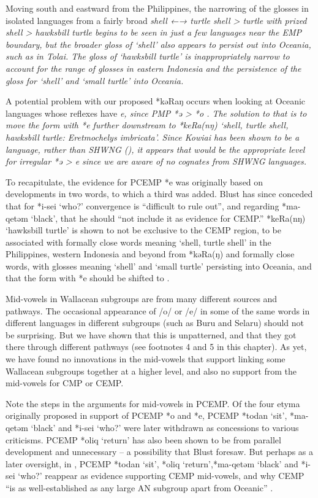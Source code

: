 Moving south and eastward from the Philippines,
the narrowing of the glosses in isolated languages from a fairly
broad \it{shell} ←→ \it{turtle shell > turtle with prized shell
> hawksbill turtle} begins to be seen in just a few languages
near the EMP boundary,
but the broader gloss of ‘shell’ also appears to persist out
into Oceania, such as in Tolai.
The gloss of ‘hawksbill turtle’ is inappropriately narrow to
account for the range of glosses in eastern Indonesia
and the persistence of the gloss for ‘shell’
and ‘small turtle’ into Oceania.

A potential problem with our proposed *kəRaŋ occurs when looking
at Oceanic languages whose reflexes have \it{e},
since PMP *ə >  *o \citep{Ross1998}.
The solution to that is to move the form with *e further downstream
to  *keRa(nŋ) ‘shell,
turtle shell, hawksbill turtle: \it{Eretmochelys imbricata}’.
Since Kowiai has been shown to be a 
language, rather than SHWNG (),
it appears that  would be the appropriate level for
irregular *ə > \it{e} since we are aware of no cognates from SHWNG languages.

To recapitulate, the evidence for PCEMP *e was originally based
on developments in two words,
to which a third was added.
Blust has since conceded that for *i-sei ‘who?’ convergence is
“difficult to rule out”,
and regarding *ma-qetəm ‘black’,
that he should “not include it as evidence for CEMP.” *keRa(nŋ)
‘hawksbill turtle’ is shown to not be exclusive to the CEMP region,
to be associated with formally close words meaning ‘shell,
turtle shell’ in the Philippines,
western Indonesia and beyond from *kəRa(ŋ)
and formally close words,
with glosses meaning ‘shell’
and ‘small turtle’ persisting into Oceania,
and that the form with *e should be shifted to .

Mid-vowels in Wallacean subgroups are from many different sources and pathways.
The occasional appearance of /o/ or /e/ in some of the same words
in different languages in different subgroups (such as Buru
and Selaru) should not be surprising.
But we have shown that this is unpatterned,
and that they got there through different pathways (see footnotes
4 and 5 in this chapter).
As yet, we have found no innovations in the mid-vowels that support
linking some Wallacean subgroups together at a higher level,
and also no support from the mid-vowels for CMP or CEMP.

Note the steps in the arguments for mid-vowels in PCEMP.
Of the four etyma originally proposed \citep{Blust1993} in support
of PCEMP *o and *e, PCEMP *todan ‘sit’, *ma-qetəm ‘black’
and *i-sei ‘who?’ were later withdrawn \citep{Blust2009} as concessions to various criticisms.
PCEMP *oliq ‘return’ has also been shown to be from parallel
development and unnecessary -- a possibility that Blust foresaw.
But perhaps as a later oversight,
in \citet[740]{Blust2013}, PCEMP *todan ‘sit’, *oliq ‘return’,*ma-qetəm
‘black’ and *i-sei ‘who?’ reappear as evidence supporting CEMP mid-vowels,
and why CEMP “is as well-established as any large AN subgroup
apart from Oceanic” \citep[740]{Blust2013}.

